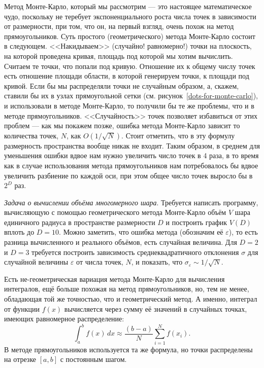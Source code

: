 \documentclass{book}
\begin{document}
Метод Монте-Карло, который мы рассмотрим --- это настоящее математическое чудо, поскольку не
теребует экспоненциального роста числа точек в зависимости от размерности, при том, что он, на
первый взгляд, очень похож на метод прямоугольников. Суть простого (геометрического) метода
Монте-Карло состоит в следующем.  <<Накидываем>> (случайно! равномерно!) точки на плоскость, на
которой проведена кривая, площадь под которой мы хотим вычислить. Считаем те точки, что попали под
кривую. Отношение их к общему числу точек есть отношение площади области, в которой генерируем
точки, к площади под кривой. Если бы мы распределяли точки не случайным образом, а, скажем, ставили
бы их в узлах прямоугольной сетки (см. рисунок~\ref{dots-for-monte-carlo}), и использовали в методе
Монте-Карло, то получили бы те же проблемы, что и в методе прямоугольников.  <<Случайность>> точек
позволяет избавиться от этих проблем --- как мы покажем позже, ошибка метода Монте-Карло зависит то
количества точек, $N$, как $O(1/\sqrt{N})$. Стоит отметить, что в эту формулу размерность
пространства вообще никак не входит.  Таким образом, в среднем для уменьшения ошибки вдвое нам
нужно увеличить число точек в 4 раза, в то время как в случае использования метода прямоугольников
нам потребовалось бы вдвое увеличить разбиение по каждой оси, при этом общее число точек выросло бы
в $2^D$ раз.

\textit{Задача о вычислении объёма многомерного шара}. Требуется написать программу, вычисляющую с
помощью геометрического метода Монте-Карло объём $V$ шара единичного радиуса в пространстве
размерности $D$ и построить график $V(D)$ вплоть до $D = 10$. Можно заметить, что ошибка метода
(обозначим её $\varepsilon$), то есть разница вычисленного и реального объёмов, есть случайная
величина. Для $D = 2$ и $D = 3$ требуется построить зависимость среднеквадратичного отклонения
$\sigma$ для случайной величины $\varepsilon$ от числа точек, $N$, и показать, что
$\sigma_\varepsilon \sim 1 / \sqrt{N}$.

Есть не-геометрическая вариация метода Монте-Карло для вычисления интегралов, ещё больше похожая на
метод прямоугольников, но, тем не менее, обладающая той же точностью, что и геометрический метод. А
именно, интеграл от функции $f(x)$ вычисляется через сумму её значений в случайных точках, имеющих
равномерное распределение:
\begin{equation}
    \int_a^b f(x) \, dx \approx \frac{(b - a)}{N} \sum_{i=1}^N f(x_i).
\end{equation}
В методе прямоугольников используется та же формула, но точки распределены на отрезке $[a, b]$ с
постоянным шагом.
\end{document}
